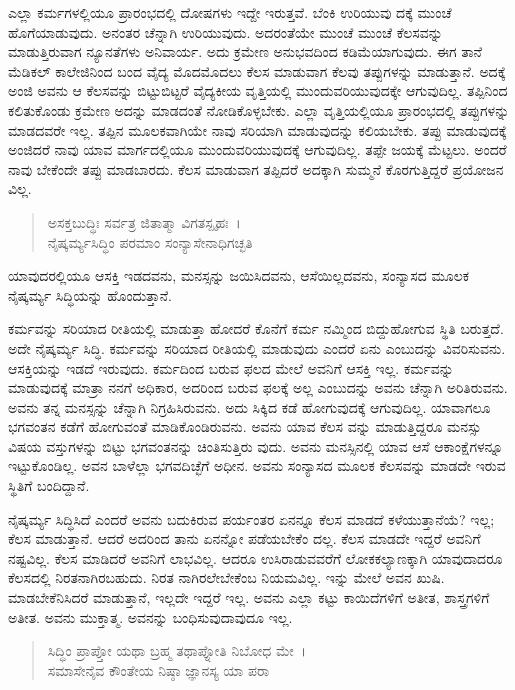 ಎಲ್ಲಾ ಕರ್ಮಗಳಲ್ಲಿಯೂ ಪ್ರಾರಂಭದಲ್ಲಿ ದೋಷಗಳು ಇದ್ದೇ ಇರುತ್ತವೆ. ಬೆಂಕಿ ಉರಿಯುವು ದಕ್ಕೆ ಮುಂಚೆ ಹೊಗೆಯಾಡುವುದು. ಅನಂತರ ಚೆನ್ನಾಗಿ ಉರಿಯುವುದು. ಅದರಂತೆಯೇ ಮುಂಚೆ ಮುಂಚೆ ಕೆಲಸವನ್ನು ಮಾಡುತ್ತಿರುವಾಗ ನ್ಯೂನತೆಗಳು ಅನಿವಾರ್ಯ. ಅದು ಕ್ರಮೇಣ ಅನುಭವದಿಂದ ಕಡಿಮೆಯಾಗುವುದು. ಈಗ ತಾನೆ ಮೆಡಿಕಲ್ ಕಾಲೇಜಿನಿಂದ ಬಂದ ವೈದ್ಯ ಮೊದಮೊದಲು ಕೆಲಸ ಮಾಡುವಾಗ ಕೆಲವು ತಪ್ಪುಗಳನ್ನು ಮಾಡುತ್ತಾನೆ. ಅದಕ್ಕೆ ಅಂಜಿ ಅವನು ಆ ಕೆಲಸವನ್ನು ಬಿಟ್ಟುಬಿಟ್ಟರೆ ವೈದ್ಯಕೀಯ ವೃತ್ತಿಯಲ್ಲಿ ಮುಂದುವರಿಯುವುದಕ್ಕೇ ಆಗುವುದಿಲ್ಲ. ತಪ್ಪಿನಿಂದ ಕಲಿತುಕೊಂಡು ಕ್ರಮೇಣ ಅದನ್ನು ಮಾಡದಂತೆ ನೋಡಿಕೊಳ್ಳಬೇಕು. ಎಲ್ಲಾ ವೃತ್ತಿಯಲ್ಲಿಯೂ ಪ್ರಾರಂಭದಲ್ಲಿ ತಪ್ಪುಗಳನ್ನು ಮಾಡದವರೇ ಇಲ್ಲ. ತಪ್ಪಿನ ಮೂಲಕವಾಗಿಯೇ ನಾವು ಸರಿಯಾಗಿ ಮಾಡುವುದನ್ನು ಕಲಿಯಬೇಕು. ತಪ್ಪು ಮಾಡುವುದಕ್ಕೆ ಅಂಜಿದರೆ ನಾವು ಯಾವ ಮಾರ್ಗದಲ್ಲಿಯೂ ಮುಂದುವರಿಯುವುದಕ್ಕೆ ಆಗುವುದಿಲ್ಲ. ತಪ್ಪೇ ಜಯಕ್ಕೆ ಮೆಟ್ಟಲು. ಅಂದರೆ ನಾವು ಬೇಕೆಂದೇ ತಪ್ಪು ಮಾಡಬಾರದು. ಕೆಲಸ ಮಾಡುವಾಗ ತಪ್ಪಿದರೆ ಅದಕ್ಕಾಗಿ ಸುಮ್ಮನೆ ಕೊರಗುತ್ತಿದ್ದರೆ ಪ್ರಯೋಜನ ವಿಲ್ಲ.

\begin{verse}
ಅಸಕ್ತಬುದ್ಧಿಃ ಸರ್ವತ್ರ ಜಿತಾತ್ಮಾ ವಿಗತಸ್ಪೃಹಃ~।\\ನೈಷ್ಕರ್ಮ್ಯಸಿದ್ಧಿಂ ಪರಮಾಂ ಸಂನ್ಯಾಸೇನಾಧಿಗಚ್ಛತಿ 
\end{verse}

{\small ಯಾವುದರಲ್ಲಿಯೂ ಆಸಕ್ತಿ ಇಡದವನು, ಮನಸ್ಸನ್ನು ಜಯಿಸಿದವನು, ಆಸೆಯಿಲ್ಲದವನು, ಸಂನ್ಯಾಸದ ಮೂಲಕ ನೈಷ್ಕರ್ಮ್ಯ ಸಿದ್ಧಿಯನ್ನು ಹೊಂದುತ್ತಾನೆ.}

ಕರ್ಮವನ್ನು ಸರಿಯಾದ ರೀತಿಯಲ್ಲಿ ಮಾಡುತ್ತಾ ಹೋದರೆ ಕೊನೆಗೆ ಕರ್ಮ ನಮ್ಮಿಂದ ಬಿದ್ದುಹೋಗುವ ಸ್ಥಿತಿ ಬರುತ್ತದೆ. ಅದೇ ನೈಷ್ಕರ್ಮ್ಯ ಸಿದ್ಧಿ. ಕರ್ಮವನ್ನು ಸರಿಯಾದ ರೀತಿಯಲ್ಲಿ ಮಾಡುವುದು ಎಂದರೆ ಏನು ಎಂಬುದನ್ನು ವಿವರಿಸುವನು. ಆಸಕ್ತಿಯನ್ನು ಇಡದೆ ಇರುವುದು. ಕರ್ಮದಿಂದ ಬರುವ ಫಲದ ಮೇಲೆ ಅವನಿಗೆ ಆಸಕ್ತಿ ಇಲ್ಲ. ಕರ್ಮವನ್ನು ಮಾಡುವುದಕ್ಕೆ ಮಾತ್ರಾ ನನಗೆ ಅಧಿಕಾರ, ಅದರಿಂದ ಬರುವ ಫಲಕ್ಕೆ ಅಲ್ಲ ಎಂಬುದನ್ನು ಅವನು ಚೆನ್ನಾಗಿ ಅರಿತಿರುವನು. ಅವನು ತನ್ನ ಮನಸ್ಸನ್ನು ಚೆನ್ನಾಗಿ ನಿಗ್ರಹಿಸಿರುವನು. ಅದು ಸಿಕ್ಕಿದ ಕಡೆ ಹೋಗುವುದಕ್ಕೆ ಆಗುವುದಿಲ್ಲ. ಯಾವಾಗಲೂ ಭಗವಂತನ ಕಡೆಗೆ ಹೋಗುವಂತೆ ಮಾಡಿಕೊಂಡಿರುವನು. ಅವನು ಯಾವ ಕೆಲಸ ವನ್ನು ಮಾಡುತ್ತಿದ್ದರೂ ಮನಸ್ಸು ವಿಷಯ ವಸ್ತುಗಳನ್ನು ಬಿಟ್ಟು ಭಗವಂತನನ್ನು ಚಿಂತಿಸುತ್ತಿರು ವುದು. ಅವನು ಮನಸ್ಸಿನಲ್ಲಿ ಯಾವ ಆಸೆ ಆಕಾಂಕ್ಷೆಗಳನ್ನೂ ಇಟ್ಟುಕೊಂಡಿಲ್ಲ. ಅವನ ಬಾಳೆಲ್ಲಾ ಭಗವದಿಚ್ಛೆಗೆ ಅಧೀನ. ಅವನು ಸಂನ್ಯಾಸದ ಮೂಲಕ ಕೆಲಸವನ್ನು ಮಾಡದೇ ಇರುವ ಸ್ಥಿತಿಗೆ ಬಂದಿದ್ದಾನೆ.

ನೈಷ್ಕರ್ಮ್ಯ ಸಿದ್ಧಿಸಿದೆ ಎಂದರೆ ಅವನು ಬದುಕಿರುವ ಪರ್ಯಂತರ ಏನನ್ನೂ ಕೆಲಸ ಮಾಡದೆ ಕಳೆಯುತ್ತಾನೆಯೆ? ಇಲ್ಲ; ಕೆಲಸ ಮಾಡುತ್ತಾನೆ. ಆದರೆ ಅದರಿಂದ ತಾನು ಏನನ್ನೋ ಪಡೆಯಬೇಕೆಂ ದಲ್ಲ. ಕೆಲಸ ಮಾಡದೇ ಇದ್ದರೆ ಅವನಿಗೆ ನಷ್ಟವಿಲ್ಲ. ಕೆಲಸ ಮಾಡಿದರೆ ಅವನಿಗೆ ಲಾಭವಿಲ್ಲ. ಆದರೂ ಉಸಿರಾಡುವವರೆಗೆ ಲೋಕಕಲ್ಯಾಣಕ್ಕಾಗಿ ಯಾವುದಾದರೂ ಕೆಲಸದಲ್ಲಿ ನಿರತನಾಗಿರಬಹುದು. ನಿರತ ನಾಗಿರಲೇಬೇಕೆಂಬ ನಿಯಮವಿಲ್ಲ. ಇನ್ನು ಮೇಲೆ ಅವನ ಖುಷಿ. ಮಾಡಬೇಕೆನಿಸಿದರೆ ಮಾಡುತ್ತಾನೆ, ಇಲ್ಲದೇ ಇದ್ದರೆ ಇಲ್ಲ. ಅವನು ಎಲ್ಲಾ ಕಟ್ಟು ಕಾಯಿದೆಗಳಿಗೆ ಅತೀತ, ಶಾಸ್ತ್ರಗಳಿಗೆ ಅತೀತ. ಅವನು ಮುಕ್ತಾತ್ಮ. ಅವನನ್ನು ಬಂಧಿಸುವುದಾವುದೂ ಇಲ್ಲ.

\begin{verse}
ಸಿದ್ಧಿಂ ಪ್ರಾಪ್ತೋ ಯಥಾ ಬ್ರಹ್ಮ ತಥಾಪ್ನೋತಿ ನಿಬೋಧ ಮೇ~।\\ಸಮಾಸೇನೈವ ಕೌಂತೇಯ ನಿಷ್ಠಾ ಜ್ಞಾನಸ್ಯ ಯಾ ಪರಾ 
\end{verse}

